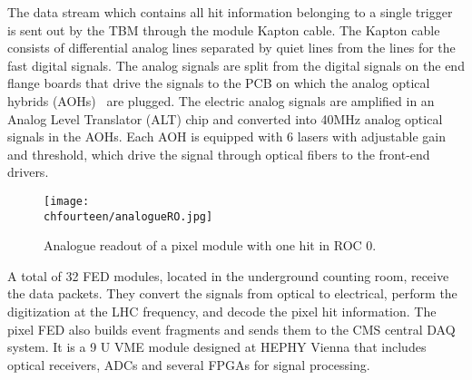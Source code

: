 The data stream which contains all hit information belonging to a single trigger is sent out by the TBM through the module Kapton cable.
The Kapton cable consists of differential analog lines separated by quiet lines from the lines for the fast digital signals.
The analog signals are split from the digital signals on the end flange boards that drive the signals to the PCB on which the analog optical hybrids (AOHs)~\cite{1221923} are plugged.
The electric analog signals are amplified in an Analog Level Translator (ALT) chip and converted into 40\unit{MHz} analog optical signals in the AOHs.
Each AOH is equipped with 6 lasers with adjustable gain and threshold, which drive the signal through optical fibers to the front-end drivers.

\begin{figure}[!htb]
 \begin{center}
 \texttt{[image: \\chfourteen/analogueRO.jpg]}
 \end{center}
 \caption{Analogue readout of a pixel module with one hit in ROC 0.}
 \label{fig:ModuleReadout}
\end{figure}

A total of 32 FED modules, located in the underground counting room, receive the data packets.
They convert the signals from optical to electrical, perform the digitization at the LHC frequency, and decode the pixel hit information.
The pixel FED also builds event fragments and sends them to the CMS central DAQ system.
It is a 9 U VME module designed at HEPHY Vienna that includes optical receivers, ADCs and several FPGAs for signal processing.

